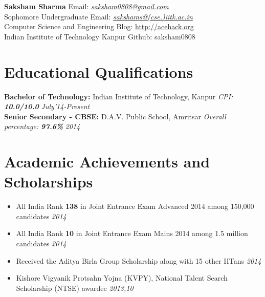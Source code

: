 \documentclass[11pt,a4paper]{article}
\begin{document}
\textbf{\huge{Saksham Sharma}} \hfill Email: \href{mailto:saksham0808@gmail.com}{\textit{saksham0808@gmail.com}}\\
Sophomore Undergraduate    \hfill  Email: \href{mailto:sakshams@cse.iitk.ac.in}{\textit{sakshams@(cse.)iitk.ac.in}}\\
Computer Science and Engineering      \hfill Blog: \url{http://acehack.org}\\
Indian Institute of Technology Kanpur \hfill Github: saksham0808

\vspace{-0.4cm}
\section*{Educational Qualifications}
\vspace{-0.2cm}
\textbf{\large{Bachelor of Technology:}} Indian Institute of Technology, Kanpur \emph{CPI: \textbf{10.0/10.0}} \hfill\textit{July'14-Present}\\
\textbf{\large{Senior Secondary - CBSE:}} D.A.V. Public School, Amritsar \emph{Overall percentage: \textbf{97.6\%}} \hfill\textit{2014}


\vspace{-0.5cm}
\section*{Academic Achievements and Scholarships}
\vspace{-0.2cm}
\begin{itemize}
\item All India Rank \textbf{138} in Joint Entrance Exam Advanced 2014 among 150,000 candidates            	\hfill \textit{2014}
\item All India Rank \textbf{10} in Joint Entrance Exam Mains 2014 among 1.5 million candidates              \hfill \textit{2014}
\item Received the Aditya Birla Group Scholarship along with 15 other IITans                        \hfill \textit{2014}
\item Kishore Vigyanik Protsahn Yojna (KVPY), National Talent Search Scholarship (NTSE) awardee
      \hfill \textit{2013,10}
\end{itemize}

\vspace{-0.6cm}
\end{document}
